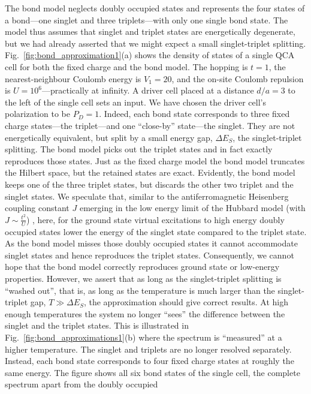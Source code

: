 The bond model neglects doubly occupied states and represents the four states of
a bond---one singlet and three triplets---with only one single bond state. The
model thus assumes that singlet and triplet states are energetically degenerate,
but we had already asserted that we might expect a small singlet-triplet
splitting. Fig.~\ref{fig:bond_approximation1}(a) shows the density of states of
a single QCA cell for both the fixed charge and the bond model. The hopping is
$t=1$, the nearest-neighbour Coulomb energy is $V_1 = 20$, and the on-site
Coulomb repulsion is $U = 10^6$---practically at infinity. A driver
cell placed at a distance $d/a = 3$ to the left of the single cell sets an
input. We have chosen the driver cell's polarization to be $P_D = 1$. Indeed, each
bond state corresponds to three fixed charge states---the triplet---and one
``close-by'' state---the singlet. They are not energetically equivalent, but
split by a small energy gap, $\Delta E_S$, the singlet-triplet splitting. The
bond model picks out the triplet states and in fact exactly reproduces those
states. Just as the fixed charge model the bond model truncates the Hilbert
space, but the retained states are exact. Evidently, the bond model keeps one of
the three triplet states, but discards the other two triplet and the singlet
states. We speculate that, similar to the antiferromagnetic Heisenberg coupling
constant $J$ emerging in the low energy limit of the Hubbard model (with $J \sim
\frac{t^2}{U}$) \cite{Auerbach}, here, for the ground state virtual excitations
to high energy doubly occupied states lower the energy of the singlet state
compared to the triplet state. As the bond model misses those doubly occupied
states it cannot accommodate singlet states and hence reproduces the triplet
states. Consequently, we cannot hope that the bond model correctly reproduces
ground state or low-energy properties. However, we assert that as long as the
singlet-triplet splitting is ``washed out'', that is, as long as the temperature
is much larger than the singlet-triplet gap, $T \gg \Delta E_S$, the
approximation should give correct results. At high enough temperatures the
system no longer ``sees'' the difference between the singlet and the triplet
states. This is illustrated in Fig.~\ref{fig:bond_approximations1}(b) where the
spectrum is ``measured'' at a higher temperature. The singlet and triplets are
no longer resolved separately.  Instead, each bond state corresponds to four
fixed charge states at roughly the same energy. The figure shows all six bond
states of the single cell, the complete spectrum apart from the doubly occupied
